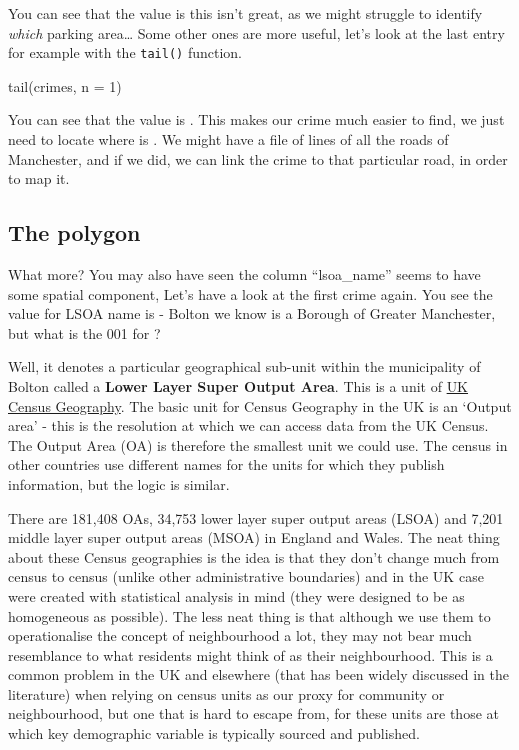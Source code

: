 \documentclass[
]{book}
\newenvironment{Shaded}{\begin{snugshade}}{\end{snugshade}}
\newcommand{\AttributeTok}[1]{\textcolor[rgb]{0.77,0.63,0.00}{#1}}
\newcommand{\DecValTok}[1]{\textcolor[rgb]{0.00,0.00,0.81}{#1}}
\newcommand{\FunctionTok}[1]{\textcolor[rgb]{0.00,0.00,0.00}{#1}}
\newcommand{\NormalTok}[1]{#1}
\begin{document}
You can see that the value is this isn't great, as we might struggle to identify \emph{which} parking area\ldots{} Some other ones are more useful, let's look at the last entry for example with the \texttt{tail()} function.

\begin{Shaded}
\begin{Highlighting}[]
\FunctionTok{tail}\NormalTok{(crimes, }\AttributeTok{n =} \DecValTok{1}\NormalTok{)}
\end{Highlighting}
\end{Shaded}

You can see that the value is . This makes our crime much easier to find, we just need to locate where is . We might have a file of lines of all the roads of Manchester, and if we did, we can link the crime to that particular road, in order to map it.

\hypertarget{the-polygon}{%
\subsection{The polygon}\label{the-polygon}}

What more? You may also have seen the column ``lsoa\_name'' seems to have some spatial component, Let's have a look at the first crime again. You see the value for LSOA name is - Bolton we know is a Borough of Greater Manchester, but what is the 001 for ?

Well, it denotes a particular geographical sub-unit within the municipality of Bolton called a \textbf{Lower Layer Super Output Area}. This is a unit of \href{https://www.ons.gov.uk/methodology/geography/ukgeographies/censusgeography}{UK Census Geography}. The basic unit for Census Geography in the UK is an `Output area' - this is the resolution at which we can access data from the UK Census. The Output Area (OA) is therefore the smallest unit we could use. The census in other countries use different names for the units for which they publish information, but the logic is similar.

There are 181,408 OAs, 34,753 lower layer super output areas (LSOA) and 7,201 middle layer super output areas (MSOA) in England and Wales. The neat thing about these Census geographies is the idea is that they don't change much from census to census (unlike other administrative boundaries) and in the UK case were created with statistical analysis in mind (they were designed to be as homogeneous as possible). The less neat thing is that although we use them to operationalise the concept of neighbourhood a lot, they may not bear much resemblance to what residents might think of as their neighbourhood. This is a common problem in the UK and elsewhere (that has been widely discussed in the literature) when relying on census units as our proxy for community or neighbourhood, but one that is hard to escape from, for these units are those at which key demographic variable is typically sourced and published.
\end{document}
